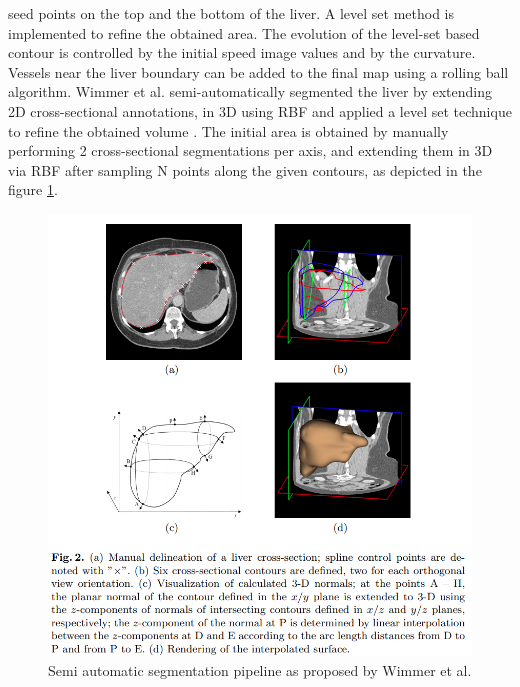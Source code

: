 \documentclass[]{article}
\begin{document}
	seed points on the top and the bottom of the liver. A level set method
	is implemented to refine the obtained area. The evolution of the
	level-set based contour is controlled by the initial speed image values
	and by the curvature. Vessels near the liver boundary can be added to
	the final map using a rolling ball algorithm.
	Wimmer et al. semi-automatically segmented the liver by extending 2D
	cross-sectional annotations, in 3D using RBF and applied a level set
	technique to refine the obtained volume \cite{Wimmer2007}. The initial area is obtained by
	manually performing 2 cross-sectional segmentations per axis, and
	extending them in 3D via RBF after sampling N points along the given
	contours, as depicted in the figure \ref{Wimmer2007_Fig2}.
	
	
	\begin{figure} [ht!]
		\centering
		\includegraphics[width=0.5\linewidth]{images/image8}
		\caption{Semi automatic segmentation pipeline as proposed by Wimmer et al. \cite{Wimmer2007}}
		\label{Wimmer2007_Fig2}
	\end{figure}
	
\end{document}
